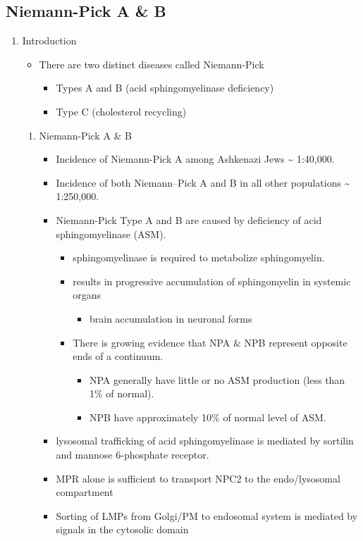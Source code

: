 \documentclass{scrartcl}
\begin{document}
\subsection{Niemann-Pick  A \& B}
\label{sec:org8a9ce67}
\begin{enumerate}
\item Introduction
\label{sec:orgc941ae1}
\begin{itemize}
\item There are two distinct diseases called Niemann-Pick
\begin{itemize}
\item Types A and B (acid sphingomyelinase deficiency)
\item Type C (cholesterol recycling)
\end{itemize}
\end{itemize}

\begin{enumerate}
\item Niemann-Pick A \& B
\label{sec:org58580a6}
\begin{itemize}
\item Incidence of Niemann-Pick A among Ashkenazi Jews \textasciitilde{} 1:40,000.
\item Incidence of both Niemann–Pick A and B in all other populations \textasciitilde{} 1:250,000.
\item Niemann-Pick Type A and B are caused by deficiency of acid sphingomyelinase (ASM).
\begin{itemize}
\item sphingomyelinase is required to metabolize sphingomyelin.
\item results in progressive accumulation of sphingomyelin in systemic organs
\begin{itemize}
\item brain accumulation in neuronal forms
\end{itemize}
\item There is growing evidence that NPA \& NPB represent opposite ends of a continuum.
\begin{itemize}
\item NPA generally have little or no ASM production (less than 1\% of normal).
\item NPB have approximately 10\% of normal level of ASM.
\end{itemize}
\end{itemize}
\item lysosomal trafficking of acid sphingomyelinase is mediated by sortilin and mannose 6-phosphate receptor.
\item MPR alone is sufficient to transport NPC2 to the endo/lysosomal compartment
\item Sorting of LMPs from Golgi/PM to endosomal system is mediated by
signals in the cytosolic domain
\end{itemize}


\end{enumerate}
\end{enumerate}
\end{document}
